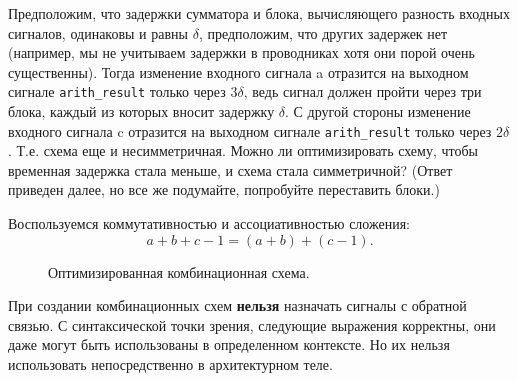  Предположим, что задержки сумматора и блока, вычисляющего разность входных сигналов, одинаковы и равны $\delta$, предположим, что других задержек нет (например, мы не учитываем задержки в проводниках хотя они порой очень существенны). Тогда изменение входного сигнала a отразится на выходном сигнале \lstinline?arith_result? только через $3 \delta$, ведь сигнал должен пройти через три блока, каждый из которых вносит задержку $\delta$. С другой стороны изменение входного сигнала c отразится на выходном сигнале \lstinline?arith_result? только через $2 \delta$. Т.е. схема еще и несимметричная. Можно ли оптимизировать схему, чтобы временная задержка стала меньше, и схема стала симметричной? (Ответ приведен далее, но все же подумайте, попробуйте переставить блоки.)

 Воспользуемся коммутативностью и ассоциативностью сложения: 
\[
a + b + c - 1 = (a + b) + (c - 1).
\]

\begin{figure}[ht]
\centering
{}
\caption{Оптимизированная комбинационная схема.}
\label{comb_circuit_opt}
\end{figure}

При создании комбинационных схем \textbf{нельзя} назначать сигналы с обратной связью. С синтаксической точки зрения, следующие выражения корректны, они даже могут быть использованы в определенном контексте. Но их нельзя использовать непосредственно в архитектурном теле.

